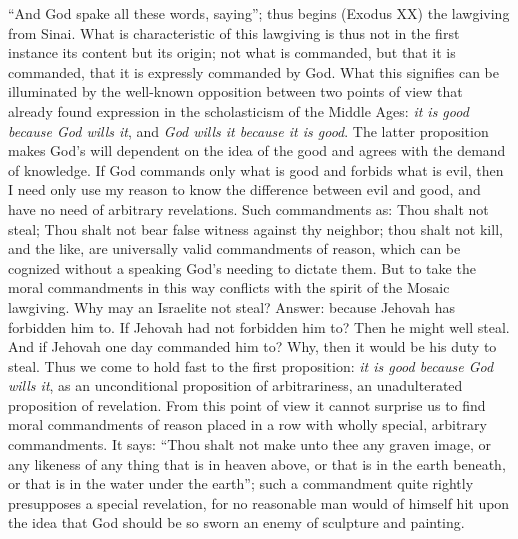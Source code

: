 \documentclass[12pt]{book}
\newcommand{\opage}[1]{\marginnote{\footnotesize\textit{[#1]}}}
\begin{document}
``And God spake all these words, saying''; thus begins (Exodus XX) the
lawgiving from Sinai. What is characteristic of this lawgiving is thus not
in the first instance its content but its origin; not what is commanded,
but that it is commanded, that it is expressly commanded by God. What this
signifies can be illuminated by the well-known opposition between two
points of view that
\opage{179}\setcounter{footnote}{0}%
already found expression in the scholasticism of the Middle Ages:
\textit{it is good because God wills it}, and \textit{God wills it because
it is good}. The latter proposition makes God's will dependent on the idea
of the good and agrees with the demand of knowledge. If God commands only
what is good and forbids what is evil, then I need only use my reason to
know the difference between evil and good, and have no need of arbitrary
revelations. Such commandments as: Thou shalt not steal; Thou shalt not
bear false witness against thy neighbor; thou shalt not kill, and the
like, are universally valid commandments of reason, which can be cognized
without a speaking God's needing to dictate them. But to take the moral
commandments in this way conflicts with the spirit of the Mosaic
lawgiving. Why may an Israelite not steal? Answer: because Jehovah has
forbidden him to. If Jehovah had not forbidden him to? Then he might well
steal. And if Jehovah one day commanded him to? Why, then it would be his
duty to steal. Thus we come to hold fast to the first proposition:
\textit{it is good because God wills it}, as an unconditional proposition
of arbitrariness, an unadulterated proposition of revelation. From this
point of view it cannot surprise us to find moral commandments of reason
placed in a row with wholly special, arbitrary commandments. It says:
``Thou shalt not make unto thee any graven image, or any likeness of any
thing that is in heaven above, or that is in the earth beneath, or that is
in the water under the earth''; such a commandment quite rightly
presupposes a special revelation, for no reasonable man would of himself
hit upon the idea that God should be so sworn an enemy of sculpture and
painting.
\end{document}
